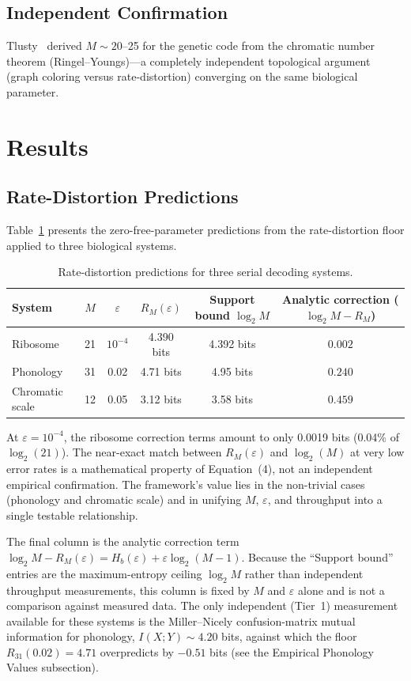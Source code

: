\documentclass[11pt]{article}
\begin{document}
\subsection{Independent Confirmation}

Tlusty~\cite{tlusty2008} derived $M \sim 20$--25 for the genetic code from the chromatic number theorem (Ringel--Youngs)---a completely independent topological argument (graph coloring versus rate-distortion) converging on the same biological parameter.

\section{Results}

\subsection{Rate-Distortion Predictions}

Table~\ref{tab:rd_predictions} presents the zero-free-parameter predictions from the rate-distortion floor applied to three biological systems.

\begin{table}[ht]
\centering
\caption{Rate-distortion predictions for three serial decoding systems.}
\label{tab:rd_predictions}
\begin{tabular}{lccccc}
\toprule
System & $M$ & $\varepsilon$ & $R_M(\varepsilon)$ & Support bound $\log_2 M$ & Analytic correction ($\log_2 M - R_M$) \\
\midrule
Ribosome & 21 & $10^{-4}$ & 4.390 bits & 4.392 bits & $0.002$ \\
Phonology & 31 & 0.02 & 4.71 bits & 4.95 bits & $0.240$ \\
Chromatic scale & 12 & 0.05 & 3.12 bits & 3.58 bits & $0.459$ \\
\bottomrule
\end{tabular}
\end{table}

At $\varepsilon = 10^{-4}$, the ribosome correction terms amount to only 0.0019 bits (0.04\% of $\log_2(21)$). The near-exact match between $R_M(\varepsilon)$ and $\log_2(M)$ at very low error rates is a mathematical property of Equation~(4), not an independent empirical confirmation. The framework's value lies in the non-trivial cases (phonology and chromatic scale) and in unifying $M$, $\varepsilon$, and throughput into a single testable relationship.

The final column is the analytic correction term $\log_2 M - R_M(\varepsilon) = H_b(\varepsilon) + \varepsilon \log_2(M-1)$. Because the ``Support bound'' entries are the maximum-entropy ceiling $\log_2 M$ rather than independent throughput measurements, this column is fixed by $M$ and $\varepsilon$ alone and is not a comparison against measured data. The only independent (Tier~1) measurement available for these systems is the Miller--Nicely confusion-matrix mutual information for phonology, $I(X;Y) \sim 4.20$ bits, against which the floor $R_{31}(0.02) = 4.71$ overpredicts by $-0.51$ bits (see the Empirical Phonology Values subsection).
\end{document}
